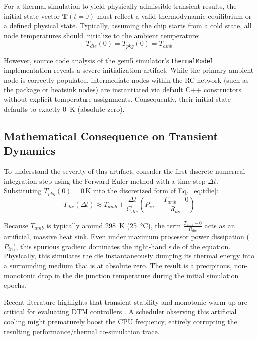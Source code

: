 For a thermal simulation to yield physically admissible transient results, the initial state vector $\mathbf{T}(t=0)$ must reflect a valid thermodynamic equilibrium or a defined physical state. Typically, assuming the chip starts from a cold state, all node temperatures should initialize to the ambient temperature:
\begin{equation}
    T_{die}(0) = T_{pkg}(0) = T_{amb}
\end{equation}

However, source code analysis of the gem5 simulator's \texttt{ThermalModel} implementation reveals a severe initialization artifact. While the primary ambient node is correctly populated, intermediate nodes within the RC network (such as the package or heatsink nodes) are instantiated via default C++ constructors without explicit temperature assignments. Consequently, their initial state defaults to exactly \SI{0}{\kelvin} (absolute zero).

\subsection{Mathematical Consequence on Transient Dynamics}

To understand the severity of this artifact, consider the first discrete numerical integration step using the Forward Euler method with a time step $\Delta t$. Substituting $T_{pkg}(0) = \SI{0}{\kelvin}$ into the discretized form of Eq.~\ref{eq:tdie}:
\begin{equation}
    T_{die}(\Delta t) \approx T_{amb} + \frac{\Delta t}{C_{die}} \left( P_{in} - \frac{T_{amb} - 0}{R_{die}} \right)
\end{equation}

Because $T_{amb}$ is typically around \SI{298}{\kelvin} (\SI{25}{\degreeCelsius}), the term $\frac{T_{amb} - 0}{R_{die}}$ acts as an artificial, massive heat sink. Even under maximum processor power dissipation ($P_{in}$), this spurious gradient dominates the right-hand side of the equation. 
Physically, this simulates the die instantaneously dumping its thermal energy into a surrounding medium that is at absolute zero. The result is a precipitous, non-monotonic drop in the die junction temperature during the initial simulation epochs. 

Recent literature highlights that transient stability and monotonic warm-up are critical for evaluating DTM controllers \cite{fasttherm2024}. A scheduler observing this artificial cooling might prematurely boost the CPU frequency, entirely corrupting the resulting performance/thermal co-simulation trace.
